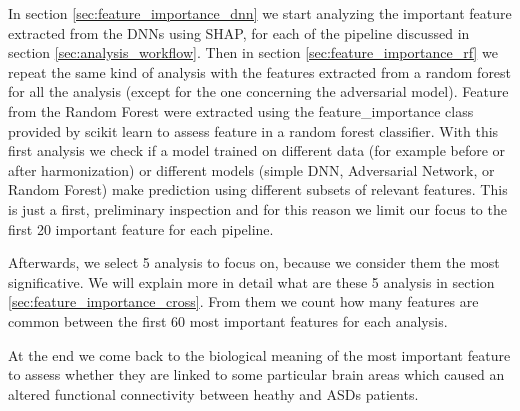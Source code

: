 \documentclass[10pt]{report}
\begin{document}
In section \ref{sec:feature_importance_dnn} we start analyzing the important feature extracted from the DNNs using SHAP, for each of the pipeline discussed in section \ref{sec:analysis_workflow}. Then in section \ref{sec:feature_importance_rf} we repeat the same kind of analysis with the features extracted from a random forest for all the analysis (except for the one concerning the adversarial model).
Feature from the Random Forest were extracted using the feature\_importance class provided by scikit learn to assess feature in a random forest classifier.
With this first analysis we check if a model trained on different data (for example before or after harmonization) or different models (simple DNN, Adversarial Network, or Random Forest) make prediction using different subsets of relevant features.
This is just a first, preliminary inspection and for this reason we limit our focus to the first 20 important feature for each pipeline.

Afterwards, we select 5 analysis to focus on, because we consider them the most significative. We will explain more in detail what are these 5 analysis in section \ref{sec:feature_importance_cross}. From them we count how many features are common between the first 60 most important features for each analysis.

At the end we come back to the biological meaning of the most important feature to assess whether they are linked to some particular brain areas which caused an altered functional connectivity between heathy and ASDs patients.





\hfill
\end{document}
